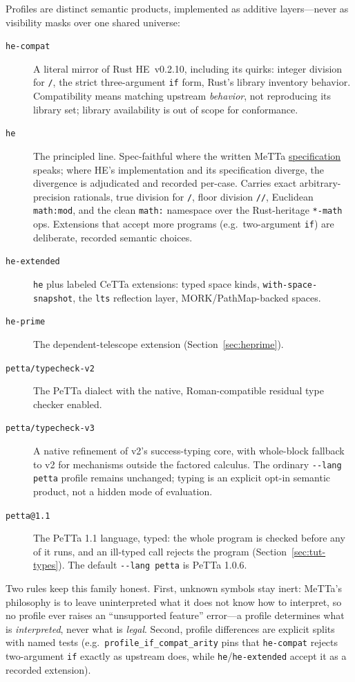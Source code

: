 \documentclass[11pt]{article}
\newcommand{\code}[1]{\texttt{#1}}
\newcommand{\PeTTa}{\textup{PeTTa}}
\newcommand{\HE}{\textup{HE}}
\newcommand{\CeTTa}{\textup{CeTTa}}
\begin{document}
Profiles are distinct semantic products, implemented as additive
layers---never as visibility masks over one shared universe:

\begin{description}
\item[\code{he-compat}] A literal mirror of Rust \HE{}~v0.2.10,
  including its quirks: integer division for \code{/}, the strict
  three-argument \code{if} form, Rust's library inventory behavior.
  Compatibility means matching upstream \emph{behavior}, not
  reproducing its library set; library availability is out of scope
  for conformance.
\item[\code{he}] The principled line.  Spec-faithful where the written
  MeTTa \href{https://trueagi-io.github.io/hyperon-experimental/metta/}{specification}
  speaks; where \HE{}'s implementation and its
  specification diverge, the divergence is adjudicated and recorded
  per-case.  Carries exact arbitrary-precision rationals, true
  division for \code{/}, floor division \code{//}, Euclidean
  \code{math:mod}, and the clean \code{math:} namespace over the
  Rust-heritage \code{*-math} ops.  Extensions that accept more
  programs (e.g.\ two-argument \code{if}) are deliberate, recorded
  semantic choices.
\item[\code{he-extended}] \code{he} plus labeled \CeTTa{} extensions:
  typed space kinds, \code{with-space-snapshot}, the \code{lts}
  reflection layer, MORK/PathMap-backed spaces.
\item[\code{he-prime}] The dependent-telescope extension
  (Section~\ref{sec:heprime}).
\item[\code{petta/typecheck-v2}] The \PeTTa{} dialect with the native,
  Roman-compatible residual type checker enabled.
\item[\code{petta/typecheck-v3}] A native refinement of v2's success-typing
  core, with whole-block fallback to v2 for mechanisms outside the factored
  calculus.  The ordinary \code{-{}-lang petta} profile remains unchanged;
  typing is an explicit opt-in semantic product, not a hidden mode of
  evaluation.
\item[\code{petta@1.1}] The \PeTTa{} 1.1 language, typed: the whole program
  is checked before any of it runs, and an ill-typed call rejects the program
  (Section~\ref{sec:tut-types}).  The default \code{-{}-lang petta} is
  \PeTTa{} 1.0.6.
\end{description}

Two rules keep this family honest.  First, unknown symbols stay
inert: MeTTa's philosophy is to leave uninterpreted what it does not
know how to interpret, so no profile ever raises an ``unsupported
feature'' error---a profile determines what is \emph{interpreted},
never what is \emph{legal}.  Second, profile differences are explicit
splits with named tests (e.g.\ \code{profile\_if\_compat\_arity}
pins that \code{he-compat} rejects two-argument \code{if} exactly as
upstream does, while \code{he}/\code{he-extended} accept it as a
recorded extension).
\end{document}
